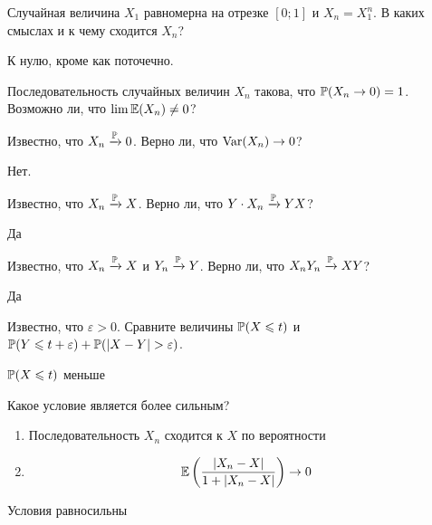 \begin{problem}
Случайная величина $X_1$ равномерна на отрезке $[0;1]$ и $X_n=X_1^n$. В каких смыслах и к чему сходится $X_n$?

\begin{sol}
К нулю, кроме как поточечно.
\end{sol}
\end{problem}

\begin{problem}
Последовательность случайных величин $X_n$ такова, что $\P(X_n\to 0)=1$. Возможно ли, что $\lim \E(X_n)\neq 0$?

\begin{sol}

\end{sol}
\end{problem}

\begin{problem}
Известно, что $X_n \xrightarrow{\P} 0$. Верно ли, что $\Var(X_n)\to 0$?

\begin{sol}
Нет.
\end{sol}
\end{problem}

\begin{problem}
Известно, что $X_n \xrightarrow{\P} X$. Верно ли, что $Y\cdot X_n \xrightarrow{\P} YX$?

\begin{sol}
Да
\end{sol}
\end{problem}

\begin{problem}
Известно, что $X_n \xrightarrow{\P} X$ и $Y_n \xrightarrow{\P} Y$. Верно ли, что $X_nY_n \xrightarrow{\P} XY$?

\begin{sol}
Да
\end{sol}
\end{problem}

\begin{problem}
Известно, что $\varepsilon>0$. Сравните величины $\P(X\leq t)$ и $\P(Y\leq t+\varepsilon)+\P(|X-Y|>\varepsilon)$.

\begin{sol}
$\P(X\leq t)$ меньше
\end{sol}
\end{problem}

\begin{problem}
Какое условие является более сильным?
\begin{enumerate}
\item Последовательность $X_n$ сходится к $X$ по вероятности
\item \[
\E\left(\frac{|X_n-X|}{1+|X_n-X|}\right)\to 0
\]
\end{enumerate}

\begin{sol}
Условия равносильны
\end{sol}
\end{problem}

